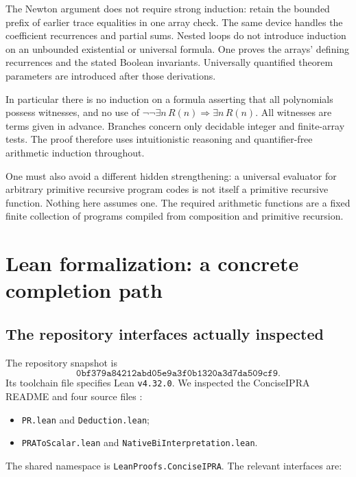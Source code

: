 \documentclass[11pt]{article}
\theoremstyle{definition}
\begin{document}
The Newton argument does not require strong induction: retain the
bounded prefix of earlier trace equalities in one array check.
The same device handles the coefficient recurrences and partial
sums. Nested loops do not introduce induction on an unbounded
existential or universal formula. One proves the arrays' defining
recurrences and the stated Boolean invariants. Universally quantified
theorem parameters are introduced after those derivations.

In particular there is no induction on a formula asserting that all
polynomials possess witnesses, and no use of
\(\neg\neg\exists n\,R(n)\Rightarrow\exists n\,R(n)\).
All witnesses are terms given in advance. Branches concern only
decidable integer and finite-array tests. The proof therefore uses
intuitionistic reasoning and quantifier-free arithmetic induction
throughout.

One must also avoid a different hidden strengthening: a universal
evaluator for arbitrary primitive recursive program codes is not
itself a primitive recursive function. Nothing here assumes one.
The required arithmetic functions are a fixed finite collection of
programs compiled from composition and primitive recursion.

\section{Lean formalization: a concrete completion path}\label{sec:lean}

\subsection{The repository interfaces actually inspected}

The repository snapshot is
\[
 \texttt{0bf379a84212abd05e9a3f0b1320a3d7da509cf9}.
\]
Its toolchain file specifies Lean \texttt{v4.32.0}.
We inspected the ConciseIPRA README and four source files
\cite{repoPR,repoDeduction,repoNative}:
\begin{itemize}[nosep]
\item \texttt{PR.lean} and \texttt{Deduction.lean};
\item \texttt{PRAToScalar.lean} and \texttt{NativeBiInterpretation.lean}.
\end{itemize}
The shared namespace is \texttt{LeanProofs.ConciseIPRA}.
The relevant interfaces are:
\end{document}
